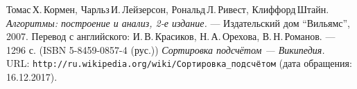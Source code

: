 \begin{thebibliography}{99}
Томас\,Х.\,Кормен, Чарльз\,И.\,Лейзерсон, Рональд\,Л.\,Ривест, Клиффорд\,Штайн.
{\itshape Алгоритмы: построение и анализ, 2-е издание.} --- Издательский дом \enquote{Вильямс}, 2007. Перевод с английского: И.\,В.\,Красиков, Н.\,А.\,Орехова, В.\,Н.\,Романов. --- 1296 с. (ISBN 5-8459-0857-4 (рус.))
{\itshape Сортировка подсчётом — Википедия.} \\URL: \texttt{http://ru.wikipedia.org/wiki/Сортировка\_подсчётом} (дата обращения: 16.12.2017). 
\end{thebibliography}
\pagebreak


